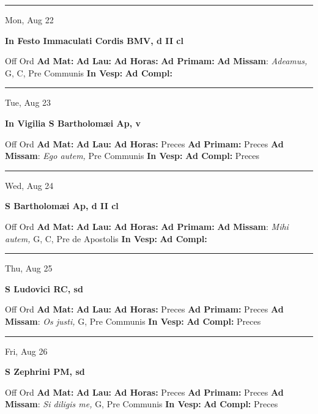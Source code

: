 \documentclass[letterpaper, 10pt]{article}
\begin{document}
\hrule
\begin{center}
Mon, Aug 22
\end{center}\textbf{ \large In Festo Immaculati Cordis BMV, \textnormal{\normalsize d II cl}}
\begin{justify}
Off Ord
\textbf{Ad Mat: }
\textbf{Ad Lau: }
\textbf{Ad Horas: }
\textbf{Ad Primam: }
\textbf{Ad Missam}: \textit{Adeamus,} G, C, Pre Communis
\textbf{In Vesp: }
\textbf{Ad Compl: }\end{justify}



\hrule
\begin{center}
Tue, Aug 23
\end{center}\textbf{ \large In Vigilia S Bartholomæi Ap, \textnormal{\normalsize v}}
\begin{justify}
Off Ord
\textbf{Ad Mat: }
\textbf{Ad Lau: }
\textbf{Ad Horas: }Preces
\textbf{Ad Primam: }Preces
\textbf{Ad Missam}: \textit{Ego autem,} Pre Communis
\textbf{In Vesp: }
\textbf{Ad Compl: }Preces\end{justify}



\hrule
\begin{center}
Wed, Aug 24
\end{center}\textbf{ \large S Bartholomæi Ap, \textnormal{\normalsize d II cl}}
\begin{justify}
Off Ord
\textbf{Ad Mat: }
\textbf{Ad Lau: }
\textbf{Ad Horas: }
\textbf{Ad Primam: }
\textbf{Ad Missam}: \textit{Mihi autem,} G, C, Pre de Apostolis
\textbf{In Vesp: }
\textbf{Ad Compl: }\end{justify}



\hrule
\begin{center}
Thu, Aug 25
\end{center}\textbf{ \large S Ludovici RC, \textnormal{\normalsize sd}}
\begin{justify}
Off Ord
\textbf{Ad Mat: }
\textbf{Ad Lau: }
\textbf{Ad Horas: }Preces
\textbf{Ad Primam: }Preces
\textbf{Ad Missam}: \textit{Os justi,} G, Pre Communis
\textbf{In Vesp: }
\textbf{Ad Compl: }Preces\end{justify}



\hrule
\begin{center}
Fri, Aug 26
\end{center}\textbf{ \large S Zephrini PM, \textnormal{\normalsize sd}}
\begin{justify}
Off Ord
\textbf{Ad Mat: }
\textbf{Ad Lau: }
\textbf{Ad Horas: }Preces
\textbf{Ad Primam: }Preces
\textbf{Ad Missam}: \textit{Si diligis me,} G, Pre Communis
\textbf{In Vesp: }
\textbf{Ad Compl: }Preces\end{justify}
\end{document}
